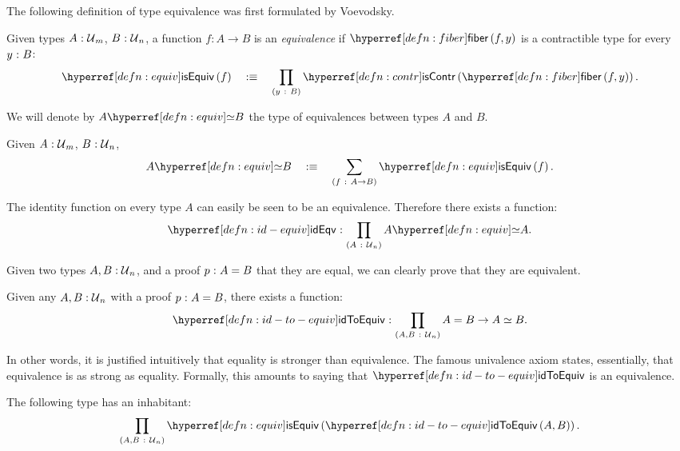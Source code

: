 The following definition of type equivalence was first formulated by Voevodsky.
\begin{defn}[Equivalence]\label{defn:equiv}
  Given types $A\hspace{0.1mm}:\hspace{0.1mm}\mathcal{U}{}_m$, $B\hspace{0.1mm}:\hspace{0.1mm}\mathcal{U}{}_n$, a function $f : A \rightarrow B$ is an
  \emph{equivalence} if $\fiber{f}{y}$ is a contractible type for every $y\hspace{0.1mm}:\hspace{0.1mm}B$:
  \begin{equation*}
    \isequiv{f} \quad\is\quad \pity{y}{B}{\iscontr{\fiber{f}{y}}}.
  \end{equation*}
\end{defn}

We will denote by $\typequiv{A}{B}$ the type of equivalences between types $A$ and $B$.
\begin{defn}
  Given $A\hspace{0.1mm}:\hspace{0.1mm}\mathcal{U}{}_m$, $B\hspace{0.1mm}:\hspace{0.1mm}\mathcal{U}{}_n$,
  \begin{equation*}
    \typequiv{A}{B} \quad\is\quad \sigmaty{f}{A \rightarrow B}{\isequiv{f}}.
  \end{equation*}
\end{defn}

\begin{defn}\label{defn:id-equiv}
  The identity function on every type $A$ can easily be seen to be an equivalence.
  Therefore there exists a function:
  \begin{equation*}
    \oftyI{\idequivnm}{\pity{A}{\univ{}_n}{\typequiv{A}{A}}}.
  \end{equation*}
\end{defn}

Given two types $A, B:\mathcal{U}{}_n$, and a proof $p\hspace{0.1mm}:\hspace{0.1mm}A = B$ that they are
equal, we can clearly prove that they are equivalent.
\begin{defn}\label{defn:id-to-equiv}
  Given any $A, B:\mathcal{U}{}_n$ with a proof $p\hspace{0.1mm}:\hspace{0.1mm}A = B$, there exists a
  function:
  \begin{equation*}
    \oftyI{\idtoeqvnm{}}{\pity{A, B}{\univ{}_n}{A = B \rightarrow A \simeq B}}.
  \end{equation*}
\end{defn}

In other words, it is justified intuitively that equality is stronger than equivalence.
The famous univalence axiom states, essentially, that equivalence is as strong as
equality. Formally, this amounts to saying that $\idtoeqvnm{}$ is an equivalence.

\begin{ax}[Univalence]\label{ax:ua}
  The following type has an inhabitant:
  \begin{equation*}
    \pity{A, B}{\univ{}_n}{\isequiv{\idtoeqv{A}{B}}}.
  \end{equation*}
\end{ax}

